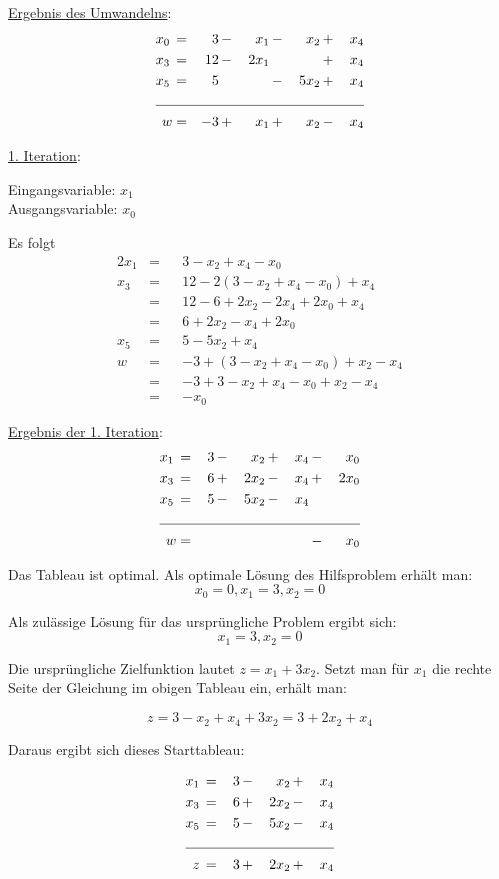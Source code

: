 \documentclass[10pt,a4paper,oneside,ngerman,numbers=noenddot]{scrartcl}
\begin{document}
		\underline{Ergebnis des Umwandelns}:
		\begin{alignat*}{5}
			x_{0} \,&=&\, 3 \,&-&\, x_{1} \,&-&\, x_{2} \,&+&\, x_{4} \\
			x_{3} \,&=&\, 12 \,&-&\, 2x_{1} \,&& &+&\, x_{4} \\
			x_{5} \,&=&\, 5 \,&& &-&\, 5x_{2} \,&+&\, x_{4} \\ \cline{1 - 9}
			w &=& -3 \,&+&\, x_{1} \,&+&\, x_{2} \,&-&\, x_{4}
		\end{alignat*}
		
		\underline{1. Iteration}:
		
		Eingangsvariable: $x_{1}$ \\
		Ausgangsvariable: $x_{0}$
		
		Es folgt
		\begin{alignat*}{2}
			x_{1} &=&& 3 - x_{2} + x_{4} - x_{0} \\
			x_{3} &=&& 12 - 2\left(3 - x_{2} + x_{4} - x_{0}\right) + x_{4} \\
			&=&& 12 - 6 + 2x_{2} - 2x_{4} + 2x_{0} + x_{4} \\
			&=&& 6 + 2x_{2} - x_{4} + 2x_{0} \\
			x_{5} &=&& 5 - 5x_{2} + x_{4} \\
			w &=&& -3 + \left(3 - x_{2} + x_{4} - x_{0}\right) + x_{2} - x_{4} \\
			&=&& -3 + 3 - x_{2} + x_{4} - x_{0} + x_{2} - x_{4} \\
			&=&& - x_{0}
		\end{alignat*}
		
		\underline{Ergebnis der 1. Iteration}:
		\begin{alignat*}{5}
			x_{1} \,&=&\, 3 \,&-&\, x_{2} \,&+&\, x_{4} \,&-&\, x_{0}  \\
			x_{3} \,&=&\, 6 \,&+&\, 2x_{2} \,&-&\, x_{4} \,&+&\, 2x_{0} \\
			x_{5} \,&=&\, 5 \,&-&\, 5x_{2} \,&-&\, x_{4} \,&& \\ \cline{1 - 9}
			w &=& && && &-& x_{0} 
		\end{alignat*}
		
		Das Tableau ist optimal. Als optimale Lösung des Hilfsproblem erhält man:
		\[
			x_{0} =0, x_{1} = 3, x_{2} = 0
		\]
		
		Als zulässige Lösung für das ursprüngliche Problem ergibt sich:
		\[
			x_{1} = 3, x_{2} = 0
		\]
		
		Die ursprüngliche Zielfunktion lautet $z = x_{1} + 3x_{2}$. Setzt man für $x_{1}$ die rechte Seite der Gleichung im obigen Tableau ein, erhält man:
		
		\[
			z = 3 - x_{2} + x_{4} + 3x_{2} = 3 + 2x_{2} + x_{4}
		\]
		
		Daraus ergibt sich dieses Starttableau:
		
		\begin{alignat*}{4}
			x_{1} \,&=&\, 3 \,&-&\, x_{2} \,&+&\, x_{4} \\
			x_{3} \,&=&\, 6 \,&+&\, 2x_{2} \,&-&\, x_{4} \\
			x_{5} \,&=&\, 5 \,&-&\, 5x_{2} \,&-&\, x_{4} \\ \cline{1 - 7}
			z \,&=&\, 3 \,&+&\, 2x_{2} \,&+&\, x_{4}
		\end{alignat*}
		
\end{document}
